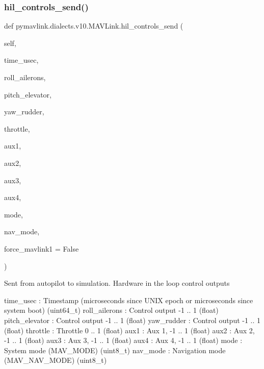 \begin{DoxyVerb}
\begin{DoxyVerb}
\subsubsection{\texorpdfstring{hil\+\_\+controls\+\_\+send()}{hil\_controls\_send()}}
{\footnotesize\ttfamily def pymavlink.\+dialects.\+v10.\+M\+A\+V\+Link.\+hil\+\_\+controls\+\_\+send (\begin{DoxyParamCaption}\item[{}]{self,  }\item[{}]{time\+\_\+usec,  }\item[{}]{roll\+\_\+ailerons,  }\item[{}]{pitch\+\_\+elevator,  }\item[{}]{yaw\+\_\+rudder,  }\item[{}]{throttle,  }\item[{}]{aux1,  }\item[{}]{aux2,  }\item[{}]{aux3,  }\item[{}]{aux4,  }\item[{}]{mode,  }\item[{}]{nav\+\_\+mode,  }\item[{}]{force\+\_\+mavlink1 = {\ttfamily False} }\end{DoxyParamCaption})}

\begin{DoxyVerb}Sent from autopilot to simulation. Hardware in the loop control
outputs

time_usec                 : Timestamp (microseconds since UNIX epoch or microseconds since system boot) (uint64_t)
roll_ailerons             : Control output -1 .. 1 (float)
pitch_elevator            : Control output -1 .. 1 (float)
yaw_rudder                : Control output -1 .. 1 (float)
throttle                  : Throttle 0 .. 1 (float)
aux1                      : Aux 1, -1 .. 1 (float)
aux2                      : Aux 2, -1 .. 1 (float)
aux3                      : Aux 3, -1 .. 1 (float)
aux4                      : Aux 4, -1 .. 1 (float)
mode                      : System mode (MAV_MODE) (uint8_t)
nav_mode                  : Navigation mode (MAV_NAV_MODE) (uint8_t)\end{DoxyVerb}
 \mbox{\label{classpymavlink_1_1dialects_1_1v10_1_1MAVLink_aed551c29bcfdd9b38040ba83645587f8}} 

\end{DoxyVerb}
\end{DoxyVerb}

